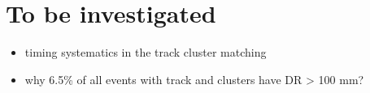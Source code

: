 

\section{To be investigated} 


\begin{itemize}
\item 
  timing systematics in the track cluster matching
\item 
  why 6.5\% of all events with track and clusters have DR > 100 mm? 
\end{itemize}
